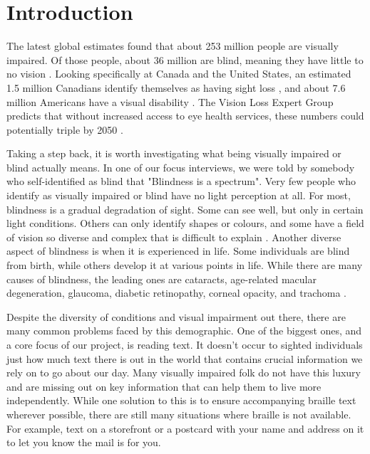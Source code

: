 \documentclass[a4paper,11pt]{article}
\begin{document}
\section{Introduction}
The latest global estimates found that about 253 million people are visually impaired. Of those people, about 36 million are blind, meaning they have little to no vision \cite{orbis-global-blind-data}. Looking specifically at Canada and the United States, an estimated 1.5 million Canadians identify themselves as having sight loss \cite{cnib-blind-data}, and about 7.6 million Americans have a visual disability \cite{nfb-blind-data}. The Vision Loss Expert Group predicts that without increased access to eye health services, these numbers could potentially triple by 2050 \cite{orbis-global-blind-data}.

Taking a step back, it is worth investigating what being visually impaired or blind actually means. In one of our focus interviews, we were told by somebody who self-identified as blind that "Blindness is a spectrum". Very few people who identify as visually impaired or blind have no light perception at all. For most, blindness is a gradual degradation of sight. Some can see well, but only in certain light conditions. Others can only identify shapes or colours, and some have a field of vision so diverse and complex that is difficult to explain \cite{lighthouse-sf-info-page}. Another diverse aspect of blindness is when it is experienced in life. Some individuals are blind from birth, while others develop it at various points in life. While there are many causes of blindness, the leading ones are cataracts, age-related macular degeneration, glaucoma, diabetic retinopathy, corneal opacity, and trachoma \cite{WHO-blindness}.

Despite the diversity of conditions and visual impairment out there, there are many common problems faced by this demographic. One of the biggest ones, and a core focus of our project, is reading text. It doesn't occur to sighted individuals just how much text there is out in the world that contains crucial information we rely on to go about our day. Many visually impaired folk do not have this luxury and are missing out on key information that can help them to live more independently. While one solution to this is to ensure accompanying braille text wherever possible, there are still many situations where braille is not available. For example, text on a storefront or a postcard with your name and address on it to let you know the mail is for you.
\end{document}
